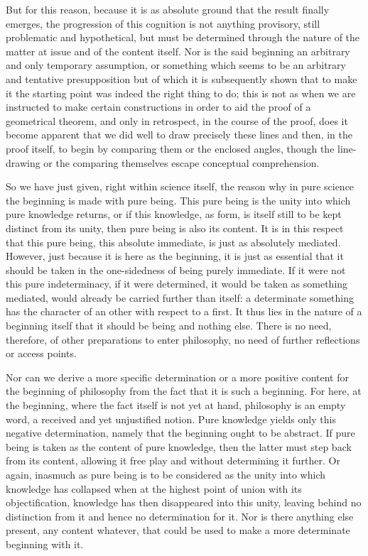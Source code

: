 But for this reason, because it is as absolute ground
that the result finally emerges,
the progression of this cognition is not anything provisory,
still problematic and hypothetical,
but must be determined through the nature
of the matter at issue and of the content itself.
Nor is the said beginning an arbitrary and only temporary assumption,
or something which seems to be an arbitrary and tentative presupposition
but of which it is subsequently shown that to make it the starting point
was indeed the right thing to do;
this is not as when we are instructed
to make certain constructions in order
to aid the proof of a geometrical theorem,
and only in retrospect, in the course of the proof,
does it become apparent that we did well to draw
precisely these lines and then, in the proof itself,
to begin by comparing them or the enclosed angles,
though the line-drawing or the comparing
themselves escape conceptual comprehension.

So we have just given, right within science itself,
the reason why in pure science the beginning is made with pure being.
This pure being is the unity into which pure knowledge returns,
or if this knowledge, as form, is itself still to be
kept distinct from its unity, then pure being is also its content.
It is in this respect that this pure being, this absolute immediate,
is just as absolutely mediated.
However, just because it is here as the beginning,
it is just as essential that it should be taken
in the one-sidedness of being purely immediate.
If it were not this pure indeterminacy, if it were determined,
it would be taken as something mediated,
would already be carried further than itself:
a determinate something has the character of an other
with respect to a first.
It thus lies in the nature of a beginning itself
that it should be being and nothing else.
There is no need, therefore, of other preparations to enter philosophy,
no need of further reflections or access points.

Nor can we derive a more specific determination
or a more positive content
for the beginning of philosophy
from the fact that it is such a beginning.
For here, at the beginning, where the fact itself is not yet at hand,
philosophy is an empty word, a received and yet unjustified notion.
Pure knowledge yields only this negative determination,
namely that the beginning ought to be abstract.
If pure being is taken as the content of pure knowledge,
then the latter must step back from its content,
allowing it free play and without determining it further.
Or again, inasmuch as pure being is to be considered
as the unity into which knowledge has collapsed
when at the highest point of union with its objectification,
knowledge has then disappeared into this unity,
leaving behind no distinction from it
and hence no determination for it.
Nor is there anything else present, any content whatever,
that could be used to make a more determinate beginning with it.

